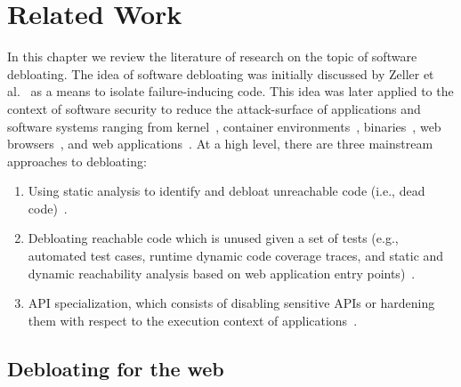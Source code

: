 \chapter{Related Work}
\label{chap:relatedwork}

In this chapter we review the literature of research on the topic of software debloating. 
The idea of software debloating was initially discussed by Zeller et al.~\cite{zeller2002simplifying} as a means to isolate failure-inducing code. 
This idea was later applied to the context of software security to reduce the attack-surface of applications and software systems ranging from kernel~\cite{abubakar2021shard}, container environments~\cite{rastogi2017Cimplifier,259711}, binaries~\cite{hasan2022decap, redini2019b, heo2018effective,ghavamnia2020temporal, mishra2020saffire, koo2019configuration, quach2018debloating}, web browsers~\cite{snyder2017most, qian2020slimium}, and web applications~\cite{azad2019less, bulekov2021saphire, mininode, jahanshahi2020you}. 
At a high level, there are three mainstream approaches to debloating: 

\begin{enumerate}
    \item Using static analysis to identify and debloat unreachable code (i.e., dead code)~\cite{redini2019b, snyder2017most, quach2018debloating, mininode, 255308}.
    \item Debloating reachable code which is unused given a set of tests (e.g., automated test cases, runtime dynamic code coverage traces, and static and dynamic reachability analysis based on web application entry points)~\cite{lessismore, heo2018effective,qian2020slimium, koo2019configuration}.
    \item API specialization, which consists of disabling sensitive APIs or hardening them with respect to the execution context of applications~\cite{mishra2020saffire, saphire, jahanshahi2020you, mishra2021sgxpecial}. 
\end{enumerate}


\section{Debloating for the web}

